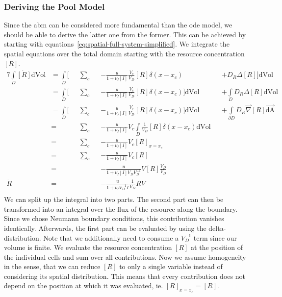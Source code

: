 \documentclass[10pt,A4paper]{article}
\numberwithin{equation}{section}
\begin{document}
\subsubsection*{Deriving the Pool Model}
\label{subsec:supplement-deriving-pool-odes}
Since the \ac{abm} can be considered more fundamental than the \ac{ode} model, we should be able to derive the latter one from the former.
This can be achieved by starting with equations~\eqref{eq:spatial-full-system-simplified}.
We integrate the spatial equations over the total domain starting with the resource concentration $[R]$.
\begin{alignat}{7}
    \int\limits_D\dot{[R]}\text{dVol} 
    &= \int\limits_D\bigg[&&\sum\limits_c &&-\frac{u}{1+\nu_I [I]} \frac{V_c}{V_D} [R] \delta(x-x_c) &&+ D_R\Delta [R]\bigg]\text{dVol}\\
    &= \int\limits_D\bigg[&&\sum\limits_c &&-\frac{u}{1+\nu_I [I]} \frac{V_c}{V_D} [R] \delta(x-x_c)\bigg]\text{dVol} &&+ \int\limits_D D_R\Delta [R]\text{dVol}\\
    &= \int\limits_D\bigg[&&\sum\limits_c &&-\frac{u}{1+\nu_I [I]} \frac{V_c}{V_D} [R] \delta(x-x_c)\bigg]\text{dVol} &&+ \int\limits_{\partial D} D_R\vec{\nabla} [R]\vec{\text{dA}}\\
    &= &&\sum\limits_c &&-\frac{u}{1+\nu_I [I]} V_c \int\limits_D \frac{1}{V_D} [R] \delta(x-x_c)\text{dVol}\\
    &= &&\sum\limits_c &&-\frac{u}{1+\nu_I [I]} V_c [R]_{x=x_c}\\
    &= &&\sum\limits_c &&-\frac{u}{1+\nu_I [I]} V_c [R]\\
    &= &&&&-\frac{u}{1+\nu_I [I]V_D V_D^{-1}} V [R]\frac{V_D}{V_D}\\
    \dot{R} &= &&&&-\frac{u}{1+\nu_I V_D^{-1}I} \frac{1}{V_D} R V\\
\end{alignat}
We can split up the integral into two parts.
The second part can then be transformed into an integral over the flux of the resource along the boundary.
Since we chose Neumann boundary conditions, this contribution vanishes identically.
Afterwards, the first part can be evaluated by using the delta-distribution.
Note that we additionally need to consume a $V_D^{-1}$ term since our volume is finite.
We evaluate the resource concentration $[R]$ at the position of the individual cells and sum over all contributions.
Now we assume homogeneity in the sense, that we can reduce $[R]$ to only a single variable instead of considering its spatial distribution.
This means that every contribution does not depend on the position at which it was evaluated, ie. $[R]_{x=x_c}=[R]$.
\end{document}
